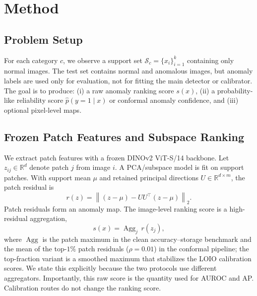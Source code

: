 \section{Method}
\subsection{Problem Setup}
For each category $c$, we observe a support set $\mathcal{S}_c=\{x_i\}_{i=1}^{k}$ containing only normal images. The test set contains normal and anomalous images, but anomaly labels are used only for evaluation, not for fitting the main detector or calibrator. The goal is to produce: (i) a raw anomaly ranking score $s(x)$, (ii) a probability-like reliability score $\hat{p}(y=1\mid x)$ or conformal anomaly confidence, and (iii) optional pixel-level maps.

\subsection{Frozen Patch Features and Subspace Ranking}
We extract patch features with a frozen DINOv2 ViT-S/14 backbone. Let $z_{ij}\in\mathbb{R}^{d}$ denote patch $j$ from image $i$. A PCA/subspace model is fit on support patches. With support mean $\mu$ and retained principal directions $U\in\mathbb{R}^{d\times m}$, the patch residual is
\begin{equation}
    r(z)=\left\|(z-\mu)-UU^{\top}(z-\mu)\right\|_2 .
\end{equation}
Patch residuals form an anomaly map. The image-level ranking score is a high-residual aggregation,
\begin{equation}
    s(x)=\operatorname{Agg}_{j}\, r(z_j),
\end{equation}
where $\operatorname{Agg}$ is the patch maximum in the clean accuracy--storage benchmark and the mean of the top-$1\%$ patch residuals ($\rho{=}0.01$) in the conformal pipeline; the top-fraction variant is a smoothed maximum that stabilizes the LOIO calibration scores. We state this explicitly because the two protocols use different aggregators. Importantly, this raw score is the quantity used for AUROC and AP. Calibration routes do not change the ranking score.

